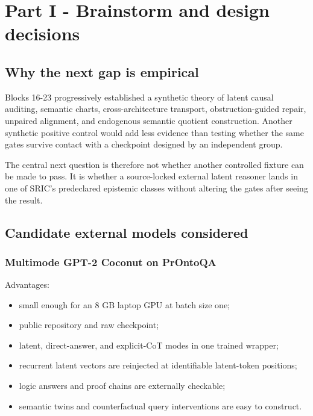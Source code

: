 \documentclass[
  10pt,
]{article}
\providecommand{\tightlist}{%
  \setlength{\itemsep}{0pt}\setlength{\parskip}{0pt}}
\begin{document}
\section{Part I - Brainstorm and design
decisions}\label{part-i---brainstorm-and-design-decisions}

\subsection{Why the next gap is
empirical}\label{why-the-next-gap-is-empirical}

Blocks 16-23 progressively established a synthetic theory of latent
causal auditing, semantic charts, cross-architecture transport,
obstruction-guided repair, unpaired alignment, and endogenous semantic
quotient construction. Another synthetic positive control would add less
evidence than testing whether the same gates survive contact with a
checkpoint designed by an independent group.

The central next question is therefore not whether another controlled
fixture can be made to pass. It is whether a source-locked external
latent reasoner lands in one of SRIC's predeclared epistemic classes
without altering the gates after seeing the result.

\subsection{Candidate external models
considered}\label{candidate-external-models-considered}

\subsubsection{Multimode GPT-2 Coconut on
PrOntoQA}\label{multimode-gpt-2-coconut-on-prontoqa}

Advantages:

\begin{itemize}
\tightlist
\item
  small enough for an 8 GB laptop GPU at batch size one;
\item
  public repository and raw checkpoint;
\item
  latent, direct-answer, and explicit-CoT modes in one trained wrapper;
\item
  recurrent latent vectors are reinjected at identifiable latent-token
  positions;
\item
  logic answers and proof chains are externally checkable;
\item
  semantic twins and counterfactual query interventions are easy to
  construct.
\end{itemize}
\end{document}
